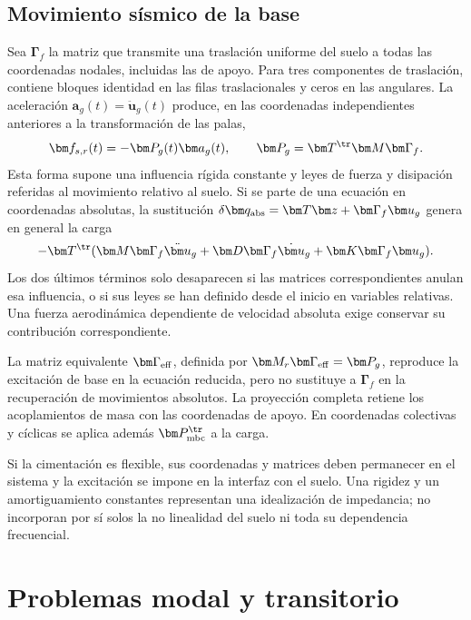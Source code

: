 \subsection{Movimiento sísmico de la base}
Sea $\bm\Gamma_f$ la matriz que transmite una traslación uniforme del suelo a todas las coordenadas nodales, incluidas las de apoyo. Para tres componentes de traslación, contiene bloques identidad en las filas traslacionales y ceros en las angulares. La aceleración $\bm a_g(t)=\ddot{\bm u}_g(t)$ produce, en las coordenadas independientes anteriores a la transformación de las palas,
\begin{equation}
\bm f_{s,r}(t)=-\bm P_g(t)\bm a_g(t),\qquad
\bm P_g=\bm T^\tr\bm M\bm\Gamma_f.
\label{eq:seismic}
\end{equation}
Esta forma supone una influencia rígida constante y leyes de fuerza y disipación referidas al movimiento relativo al suelo. Si se parte de una ecuación en coordenadas absolutas, la sustitución $\delta\bm q_{\rm abs}=\bm T\bm z+\bm\Gamma_f\bm u_g$ genera en general la carga
\begin{equation}
-\bm T^\tr(\bm M\bm\Gamma_f\ddot{\bm u}_g
+\bm D\bm\Gamma_f\dot{\bm u}_g+\bm K\bm\Gamma_f\bm u_g).
\end{equation}
Los dos últimos términos solo desaparecen si las matrices correspondientes anulan esa influencia, o si sus leyes se han definido desde el inicio en variables relativas. Una fuerza aerodinámica dependiente de velocidad absoluta exige conservar su contribución correspondiente.

La matriz equivalente $\bm\Gamma_{\rm eff}$, definida por $\bm M_r\bm\Gamma_{\rm eff}=\bm P_g$, reproduce la excitación de base en la ecuación reducida, pero no sustituye a $\bm\Gamma_f$ en la recuperación de movimientos absolutos. La proyección completa retiene los acoplamientos de masa con las coordenadas de apoyo. En coordenadas colectivas y cíclicas se aplica además $\bm P_{\rm mbc}^\tr$ a la carga.

Si la cimentación es flexible, sus coordenadas y matrices deben permanecer en el sistema y la excitación se impone en la interfaz con el suelo. Una rigidez y un amortiguamiento constantes representan una idealización de impedancia; no incorporan por sí solos la no linealidad del suelo ni toda su dependencia frecuencial.

\section{Problemas modal y transitorio}
